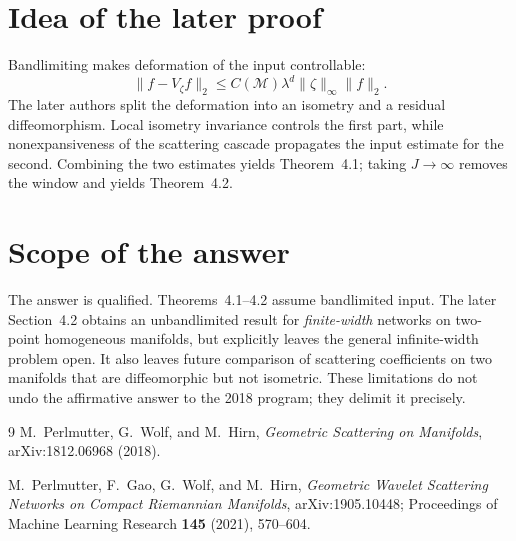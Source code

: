 \documentclass[10pt]{article}
\newcommand{\M}{\mathcal M}
\begin{document}
\section*{Idea of the later proof}

Bandlimiting makes deformation of the input controllable:
\[
       \|f-V_\zeta f\|_2
       \le C(\M)\lambda^d\|\zeta\|_\infty\|f\|_2.
\]
The later authors split the deformation into an isometry and a residual
diffeomorphism.  Local isometry invariance controls the first part, while
nonexpansiveness of the scattering cascade propagates the input estimate for
the second.  Combining the two estimates yields Theorem~4.1; taking
$J\to\infty$ removes the window and yields Theorem~4.2.

\section*{Scope of the answer}

The answer is qualified.  Theorems~4.1--4.2 assume bandlimited input.  The
later Section~4.2 obtains an unbandlimited result for \emph{finite-width}
networks on two-point homogeneous manifolds, but explicitly leaves the
general infinite-width problem open.  It also leaves future comparison of
scattering coefficients on two manifolds that are diffeomorphic but not
isometric.  These limitations do not undo the affirmative answer to the
2018 program; they delimit it precisely.

\scriptsize
\begin{thebibliography}{9}
M.~Perlmutter, G.~Wolf, and M.~Hirn,
\emph{Geometric Scattering on Manifolds}, arXiv:1812.06968 (2018).

M.~Perlmutter, F.~Gao, G.~Wolf, and M.~Hirn,
\emph{Geometric Wavelet Scattering Networks on Compact Riemannian
Manifolds}, arXiv:1905.10448; Proceedings of Machine Learning Research
\textbf{145} (2021), 570--604.
\end{thebibliography}
\end{document}
